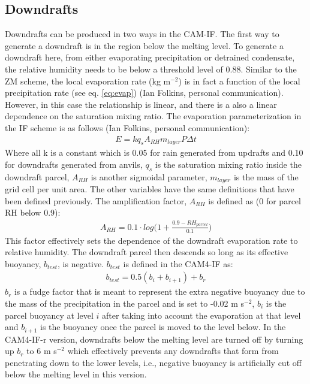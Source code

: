 \documentclass[letterpaper,12pt,titlepage,oneside,final]{book}
\begin{document}
\subsection{Downdrafts}\label{ifdown}
Downdrafts can be produced in two ways in the CAM-IF. The first way to generate a downdraft is in the region below the melting level. To generate a downdraft here, from either evaporating precipitation or detrained condensate, the relative humidity needs to be below a threshold level of 0.88. Similar to the ZM scheme, the local evaporation rate (kg m$^{-2}$) is in fact a function of the local precipitation rate (see eq. \ref{eq:evap}) (Ian Folkins, personal communication). However, in this case the relationship is linear, and there is a also a linear dependence on the saturation mixing ratio. The evaporation parameterization in the IF scheme is as follows (Ian Folkins, personal communication):
\begin{align}\label{eq:ifevap}
E=kq_{s}A_{RH}m_{layer}P\Delta{t}
\end{align}
Where all k is a constant which is 0.05 for rain generated from updrafts and 0.10 for downdrafts generated from anvils, $q_{s}$ is the saturation mixing ratio inside the downdraft parcel, $A_{RH}$ is another sigmoidal parameter, $m_{layer}$ is the mass of the grid cell per unit area. The other variables have the same definitions that have been defined previously. The amplification factor, $A_{RH}$ is defined as (0 for parcel RH below 0.9):
\begin{align}
A_{RH}=0.1\cdot{log}\bigg(1+\frac{0.9-RH_{parcel}}{0.1}\bigg)
\end{align} 
This factor effectively sets the dependence of the downdraft evaporation rate to relative humidity. The downdraft parcel then descends so long as its effective buoyancy, $b_{test}$, is negative. $b_{test}$ is defined in the CAM4-IF as:
\begin{align}
b_{test}=0.5(b_{i}+b_{i+1})+b_{r}
\end{align}
$b_{r}$ is a fudge factor that is meant to represent the extra negative buoyancy due to the mass of the precipitation in the parcel and is set to -0.02 m s$^{-2}$, $b_{i}$ is the parcel buoyancy at level $i$ after taking into account the evaporation at that level and $b_{i+1}$ is the buoyancy once the parcel is moved to the level below. In the CAM4-IF-r version, downdrafts below the melting level are turned off by turning up $b_{r}$ to 6 m s$^{-2}$ which effectively prevents any downdrafts that form from penetrating down to the lower levels, i.e., negative buoyancy is artificially cut off below the melting level in this version. 
\end{document}
